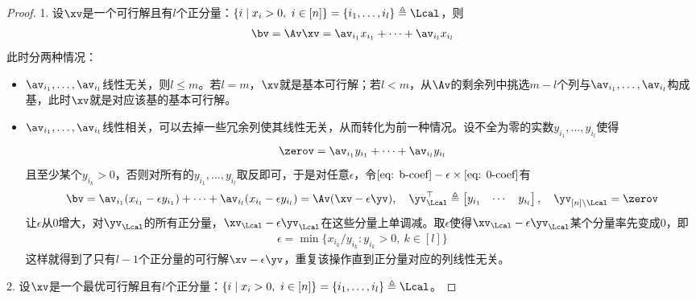 \documentclass{ctexart}
\begin{document}
\begin{proof}
    1. 设$\xv$是一个可行解且有$l$个正分量：$\{ i \mid x_i > 0, ~ i \in [n] \} = \{ i_1, \ldots, i_l \} \triangleq \Lcal$，则
    \begin{align} \label{eq: b-coef}
        \bv = \Av \xv = \av_{i_1} x_{i_1} + \cdots + \av_{i_l} x_{i_l}
    \end{align}
    此时分两种情况：
    \begin{itemize}
        \item $\av_{i_1}, \ldots, \av_{i_l}$线性无关，则$l \le m$。若$l = m$，$\xv$就是基本可行解；若$l < m$，从$\Av$的剩余列中挑选$m-l$个列与$\av_{i_1}, \ldots, \av_{i_l}$构成基，此时$\xv$就是对应该基的基本可行解。
        \item $\av_{i_1}, \ldots, \av_{i_l}$线性相关，可以去掉一些冗余列使其线性无关，从而转化为前一种情况。设不全为零的实数$y_{i_1}, \ldots, y_{i_l}$使得
              \begin{align} \label{eq: 0-coef}
                  \zerov = \av_{i_1} y_{i_1} + \cdots + \av_{i_l} y_{i_l}
              \end{align}
              且至少某个$y_{i_k} > 0$，否则对所有的$y_{i_1}, \ldots, y_{i_l}$取反即可，于是对任意$\epsilon$，令$\eqref{eq: b-coef} - \epsilon \times \eqref{eq: 0-coef}$有
              \begin{align*}
                  \bv = \av_{i_1} (x_{i_1} - \epsilon y_{i_1}) + \cdots + \av_{i_l} (x_{i_l} - \epsilon y_{i_l}) = \Av (\xv - \epsilon \yv), \quad
                  \yv_\Lcal^\top \triangleq
                  \begin{bmatrix}
                      y_{i_1} & \cdots & y_{i_l}
                  \end{bmatrix}, \quad \yv_{[n] \setminus \Lcal} = \zerov
              \end{align*}
              让$\epsilon$从$0$增大，对$\yv_\Lcal$的所有正分量，$\xv_\Lcal - \epsilon \yv_\Lcal$在这些分量上单调减。取$\epsilon$使得$\xv_\Lcal - \epsilon \yv_\Lcal$某个分量率先变成$0$，即
              \begin{align*}
                  \epsilon = \min \{ x_{i_k} / y_{i_k} : y_{i_k} > 0, ~ k \in [l] \}
              \end{align*}
              这样就得到了只有$l-1$个正分量的可行解$\xv - \epsilon \yv$，重复该操作直到正分量对应的列线性无关。
    \end{itemize}

    2. 设$\xv$是一个最优可行解且有$l$个正分量：$\{ i \mid x_i > 0, ~ i \in [n] \} = \{ i_1, \ldots, i_l \} \triangleq \Lcal$。


\end{proof}
\end{document}
